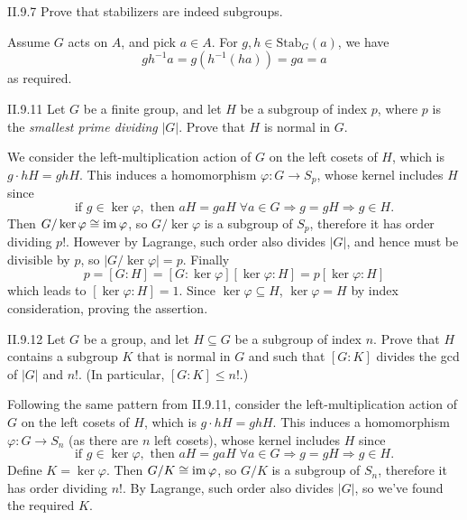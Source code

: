 \section{}

\begin{problem}{II.9.7}
Prove that stabilizers are indeed subgroups.
\end{problem}
\begin{pf}
Assume $G$ acts on $A$, and pick $a \in A$. For $g,h \in \text{Stab}_G(a)$, we have
\[
gh^{-1}a = g(h^{-1}(ha)) = ga = a
\]
as required.
\end{pf}

\begin{problem}{II.9.11}
Let $G$ be a finite group, and let $H$ be a subgroup of index $p$, where $p$ is the \emph{smallest prime dividing} $|G|$. Prove that $H$ is normal in $G$.
\end{problem}
\begin{pf}
We consider the left-multiplication action of $G$ on the left cosets of $H$, which is $g \cdot hH = ghH$. This induces a homomorphism $\varphi : G \to S_p$, whose kernel includes $H$ since
\[
\text{if } g \in \ker \varphi, \text{ then } aH = gaH \; \forall a \in G \Rightarrow g = gH \Rightarrow g \in H.
\]
Then $G/\ker \varphi \cong \operatorname{im} \varphi$, so $G/\ker \varphi$ is a subgroup of $S_p$, therefore it has order dividing $p!$. However by Lagrange, such order also divides $|G|$, and hence must be divisible by $p$, so $|G/\ker \varphi| = p$. Finally
\[
p = [G : H] = [G : \ker \varphi][\ker \varphi : H] = p[\ker \varphi : H]
\]
which leads to $[\ker \varphi : H] = 1$. Since $\ker \varphi \subseteq H$, $\ker \varphi = H$ by index consideration, proving the assertion. 
\end{pf}

\begin{problem}{II.9.12}
Let $G$ be a group, and let $H \subseteq G$ be a subgroup of index $n$. Prove that $H$ contains a subgroup $K$ that is normal in $G$ and such that $[G : K]$ divides the gcd of $|G|$ and $n!$. (In particular, $[G:K] \leq n!$.)
\end{problem}
\begin{pf}
Following the same pattern from II.9.11, consider the left-multiplication action of $G$ on the left cosets of $H$, which is $g \cdot hH = ghH$. This induces a homomorphism $\varphi : G \to S_n$ (as there are $n$ left cosets), whose kernel includes $H$ since
\[
\text{if } g \in \ker \varphi, \text{ then } aH = gaH \; \forall a \in G \Rightarrow g = gH \Rightarrow g \in H.
\]
Define $K = \ker \varphi$. Then $G/K \cong \operatorname{im} \varphi$, so $G/K$ is a subgroup of $S_n$, therefore it has order dividing $n!$. By Lagrange, such order also divides $|G|$, so we've found the required $K$.
\end{pf}

